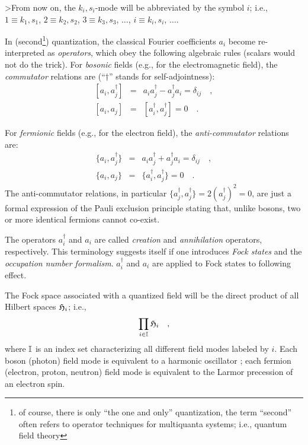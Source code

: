 >From now on, the $k_i,s_i$-mode will be abbreviated by the symbol $i$;
i.e.,
$1 \equiv k_1,s_1$,
$2 \equiv k_2,s_2$,
$3 \equiv k_3,s_3$, $\ldots$,
$i \equiv k_i,s_i$, $\ldots$.

In (second\footnote{of course, there is only ``the one and only''
quantization,
the term ``second'' often refers to operator techniques for multiquanta
systems; i.e.,  quantum field theory}) quantization,
the classical Fourier coefficients $a_{i}$ become re-interpreted as {\em
operators}, which obey the following algebraic rules
(scalars would not do the trick).
For {\em bosonic} fields (e.g., for the electromagnetic field),
the {\em commutator} relations are
(``$\dagger$'' stands for self-adjointness):
\begin{eqnarray}
\left[a_{i},a_{j}^\dagger \right]&=&
a_{i} a_{j}^\dagger - a_{j}^\dagger a_{i}
=\delta_{ij} \quad , \\
\left[
a_{i}
,
a_{j}
\right]
&=&
\left[
a_{i}^\dagger
,
a_{j}^\dagger
\right]
= 0 \quad .
\end{eqnarray}



For {\em fermionic} fields (e.g., for the electron field),
the {\em anti-commutator} relations are:
\begin{eqnarray}
\{
a_{i}
,
a_{j}^\dagger
\}
&=&
a_{i}
a_{j}^\dagger
+
a_{j}^\dagger
a_{i}
=\delta_{ij} \quad ,  \\
\{
a_{i}
,
a_{j}
\}
&=&
\{
a_{i}^\dagger
,
a_{j}^\dagger
\}
= 0 \quad .
\end{eqnarray}
The anti-commutator relations, in particular
$
\{
a_{j}^\dagger
,
a_{j}^\dagger
\} =
2(
a_{j}^\dagger)^2=0
$,
are just a formal
expression of the Pauli exclusion
principle stating that, unlike bosons, two or more identical
fermions cannot co-exist.

The operators
$
a_{i}^\dagger
$
and
$
a_{i}
$
are called {\em creation} and {\em annihilation} operators,
respectively. This terminology suggests itself if one introduces
{\em Fock states} and
the {\em occupation number formalism}.
$
a_{i}^\dagger
$
and
$
a_{i}
$
are applied to Fock states to following effect.

The Fock space associated with a quantized field will be
the direct product
of all Hilbert spaces ${\cal H}_i$; i.e.,
\begin{equation}
\prod_{i\in {\Bbb I}} {\cal H}_i
\quad ,
\end{equation}
where ${\Bbb I}$ is an index set characterizing all different
field modes labeled by $i$.
Each boson (photon) field mode is equivalent to a harmonic oscillator
\cite{glauber,loudon};
each fermion (electron, proton, neutron) field mode is equivalent to the
Larmor precession of an electron spin.


